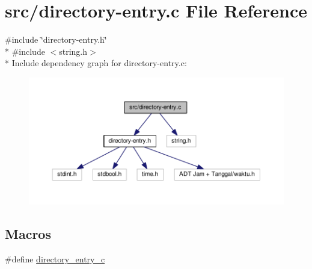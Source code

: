 \hypertarget{directory-entry_8c}{\section{src/directory-\/entry.c File Reference}
\label{directory-entry_8c}
}
{\ttfamily \#include \char`\"{}directory-\/entry.\-h\char`\"{}}\\*
{\ttfamily \#include $<$string.\-h$>$}\\*
Include dependency graph for directory-\/entry.c\-:
\nopagebreak
\begin{figure}[H]
\begin{center}
\leavevmode
\includegraphics[width=350pt]{directory-entry_8c__incl}
\end{center}
\end{figure}
\subsection*{Macros}
\begin{DoxyCompactItemize}
\item 
\#define \hyperlink{directory-entry_8c_a4cfbd0d55293ca255d9a15bad4e9e0fd}{directory\-\_\-entry\-\_\-c}
\end{DoxyCompactItemize}

